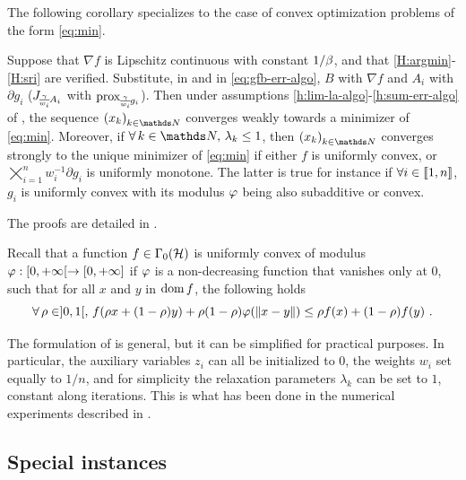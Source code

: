 The following corollary specializes  to the case of convex optimization problems of the form \eqref{eq:min}.
\begin{corollary}\label{cor:min}
Suppose that $\nabla f$ is Lipschitz continuous with constant $1/\beta$, and that \ref{H:argmin}-\ref{H:sri} are verified. Substitute, in  and in \eqref{eq:gfb-err-algo}, $B$ with $\nabla f$ and $A_i$ with $\partial g_i$ (\ie $J_{\!\frac{\gamma}{w_i}\!A_i}$ with $\operatorname{prox}_{\!\frac{\gamma}{w_i}\!g_i}$). Then under assumptions \ref{h:lim-la-algo}-\ref{h:sum-err-algo} of , the sequence $\pa{x_k}_{k \in \N}$ converges weakly towards a minimizer of \eqref{eq:min}. Moreover, if $\foralls k \in \N, \, \la_k \leq 1$, then $\pa{x_k}_{k \in \N}$ converges strongly to the unique minimizer of \eqref{eq:min} if either $f$ is uniformly convex, or $\bigtimes_{i=1}^n w_i^{-1} \partial g_i$ is uniformly monotone. The latter is true for instance if $\forall i \in \llbracket1,n\rrbracket$, $g_i$ is uniformly convex with its modulus $\varphi$ being also  subadditive or convex.
\end{corollary}

\medskip

The proofs are detailed in . 
{~}\\

\begin{remark}
Recall that a function $f \in \Gamma_0(\mathcal{H})$ is uniformly convex of modulus $\varphi: [0,{+}\infty[ \to [0,{+}\infty]$ if $\varphi$ is a non-decreasing function that vanishes only at 0, such that for all $x$ and $y$ in $\operatorname{dom} f$, the following holds
%
\begin{equation*}
\forall \, \rho \in ]0,1[, \, f(\rho x + (1-\rho) y) + \rho(1-\rho)\varphi(|\kern-1pt| x-y |\kern-1pt|) \leq \rho f(x) + (1-\rho)f(y)~.
\end{equation*}
%
\end{remark} 

\medskip

The formulation of  is general, but it can be simplified for practical purposes. In particular, the auxiliary variables $z_i$ can all be initialized to $0$, the weights $w_i$ set equally to $1/n$, and for simplicity the relaxation parameters $\lambda_k$ can be set to $1$, constant along iterations. This is what has been done in the numerical experiments described in . 

\subsection{Special instances}
\label{sec:hybrid}

